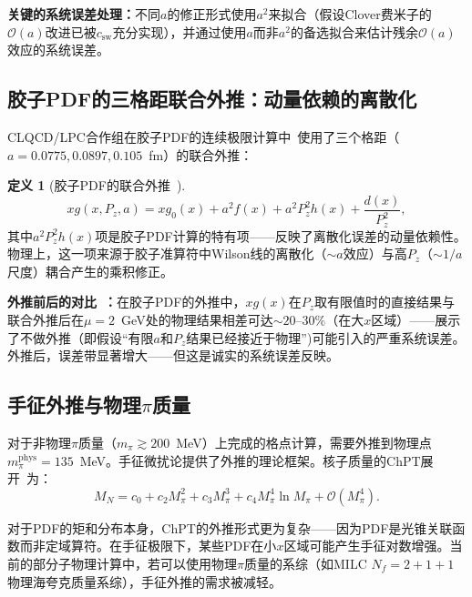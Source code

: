 \documentclass[12pt,a4paper]{ctexart}
\theoremstyle{definition}
\newtheorem{definition}{定义}[section]
\begin{document}
\textbf{关键的系统误差处理：}不同$a$的修正形式使用$a^2$来拟合（假设Clover费米子的$\mathcal{O}(a)$改进已被$c_{\text{sw}}$充分实现），并通过使用$a$而非$a^2$的备选拟合来估计残余$\mathcal{O}(a)$效应的系统误差。

\subsection{胶子PDF的三格距联合外推：动量依赖的离散化}

CLQCD/LPC合作组在胶子PDF的连续极限计算中~\cite{Chen2025gluon}使用了三个格距（$a = 0.0775, 0.0897, 0.105$~fm）的联合外推：

\begin{definition}[胶子PDF的联合外推~\cite{Chen2025gluon}]
\begin{equation}
\boxed{
xg(x, P_z, a) = xg_0(x) + a^2 f(x) + a^2 P_z^2 h(x) + \frac{d(x)}{P_z^2},
}
\label{eq:gluon_joint_full}
\end{equation}
其中\textbf{$a^2 P_z^2 h(x)$}项是胶子PDF计算的特有项——反映了离散化误差的动量依赖性。物理上，这一项来源于胶子准算符中Wilson线的离散化（$\sim a$效应）与高$P_z$（$\sim 1/a$尺度）耦合产生的乘积修正。
\end{definition}

\textbf{外推前后的对比~\cite{Chen2025gluon}：}在胶子PDF的外推中，$xg(x)$在$P_z$取有限值时的直接结果与联合外推后在$\mu=2$~GeV处的物理结果相差可达$\sim 20\text{--}30\%$（在大$x$区域）——展示了不做外推（即假设``有限$a$和$P_z$结果已经接近于物理'')可能引入的严重系统误差。外推后，误差带显著增大——但这是诚实的系统误差反映。

\subsection{手征外推与物理$\pi$质量}

对于非物理$\pi$质量（$m_\pi \gtrsim 200$~MeV）上完成的格点计算，需要外推到物理点$m_\pi^{\text{phys}} = 135$~MeV。手征微扰论提供了外推的理论框架。核子质量的ChPT展开~\cite{GattringerLang2010}为：
\begin{equation}
M_N = c_0 + c_2 M_\pi^2 + c_3 M_\pi^3 + c_4 M_\pi^4 \ln M_\pi + \mathcal{O}(M_\pi^4).
\label{eq:chiral_extrap_N}
\end{equation}

对于PDF的矩和分布本身，ChPT的外推形式更为复杂——因为PDF是光锥关联函数而非定域算符。在手征极限下，某些PDF在小$x$区域可能产生手征对数增强。当前的部分子物理计算中，若可以使用物理$\pi$质量的系综（如MILC $N_f=2+1+1$物理海夸克质量系综），手征外推的需求被减轻。
\end{document}
